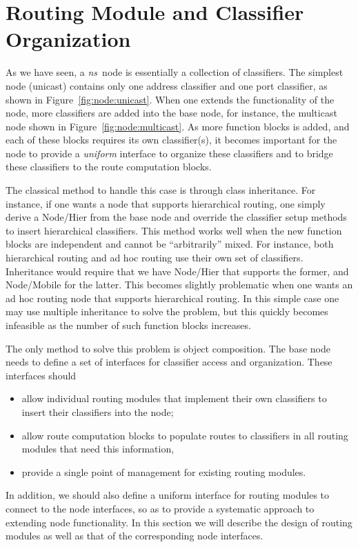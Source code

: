 \section{Routing Module and Classifier Organization}
\label{sec:node:rtarch}

As we have seen, a \emph{ns}\ node is essentially a collection of
classifiers.
The simplest node (unicast) contains only one address classifier and
one port classifier, as shown in Figure~\ref{fig:node:unicast}.
When one extends the functionality of the node, more classifiers are added
into the base node, for instance, the multicast node shown in
Figure~\ref{fig:node:multicast}.
As more function blocks is added, and each of these blocks requires
its own classifier(s), it becomes important for the node to
provide a {\em uniform} interface to organize these classifiers and to
bridge these classifiers to the route computation blocks.

The classical method to handle this case is through class
inheritance.
For instance, if one wants a node that supports hierarchical routing,
one simply derive a Node/Hier from the base node and override the
classifier setup methods to insert hierarchical classifiers.
This method works well when the new function blocks are independent
and cannot be ``arbitrarily'' mixed. 
For instance, both hierarchical routing and ad hoc routing use their
own set of classifiers. 
Inheritance would require that we have Node/Hier that supports
the former, and Node/Mobile for the latter.
This becomes slightly problematic when one wants an ad hoc routing
node that supports hierarchical routing.
In this simple case one may use multiple inheritance to solve the
problem, but this quickly becomes infeasible as the number of such
function blocks increases. 

The only method to solve this problem is object composition. 
The base node needs to define a set of interfaces for classifier
access and organization. 
These interfaces should
\begin{itemize}
\item allow individual routing modules that implement
  their own classifiers to insert their classifiers into the node;
\item allow route computation blocks to populate routes to classifiers
  in all routing modules that need this information, 
\item provide a single point of management for existing routing modules. 
\end{itemize}
In addition, we should also define a uniform interface for routing
modules to connect to the node interfaces, so as to provide a
systematic approach to extending node functionality. 
In this section we will describe the design of routing modules as well
as that of the corresponding node interfaces.

